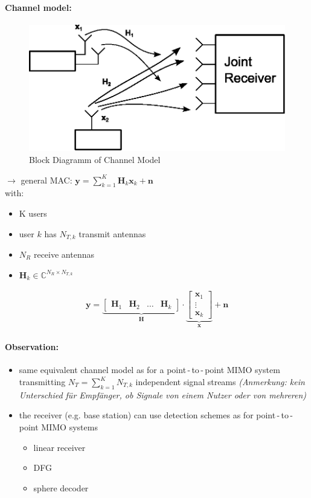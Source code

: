 \documentclass[a4paper, 10pt]{article}
\begin{document}
\paragraph*{Channel model:}
\begin{figure}[h]
	\centering
	\includegraphics[scale=0.8]{Detector_Structures_Channel_Model}
	\caption{Block Diagramm of Channel Model}
	\label{fig:Detector_Structures_Channel_Model}
\end{figure}
$\rightarrow  $ general MAC: $\mathbf{y} = \sum\limits_{k = 1}^{K}\mathbf{H}_k\mathbf{x}_k + \mathbf{n} $\\
with: \begin{itemize}
	\item K users
	\item user $k $ has $N_{T,k} $ transmit antennas
	\item $N_R $ receive antennas
	\item $\mathbf{H}_k \in \mathbb{C}^{N_R\times N_{T,k}} $ 
\end{itemize}
\begin{align*}
	\mathbf{y} = 
	\underbrace{
	\begin{bmatrix}\mathbf{H}_1 & \mathbf{H}_2 & \ldots & \mathbf{H}_k 	
	\end{bmatrix}
	}_{\mathbf{H}}\cdot
	\underbrace{
	\begin{bmatrix}\mathbf{x}_1 \\ \vdots \\ \mathbf{x}_k		
	\end{bmatrix}}_{\mathbf{x}} + \mathbf{n}
\end{align*}
\paragraph*{Observation:}
\begin{itemize}
	\item same equivalent channel model as for a point\,-\,to\,-\,point MIMO system transmitting $N_T = \sum_{k = 1}^{K} N_{T,k} $ independent signal streams \quad \textit{(Anmerkung: kein Unterschied f\"ur Empf\"anger, ob Signale von einem Nutzer oder von mehreren)}
	\item the receiver (e.g. base station) can use detection schemes as for point\,-\,to\,-\,point MIMO systems
	\begin{itemize}
		\item linear receiver
		\item DFG
		\item sphere decoder
	\end{itemize}
\end{itemize}
\end{document}
